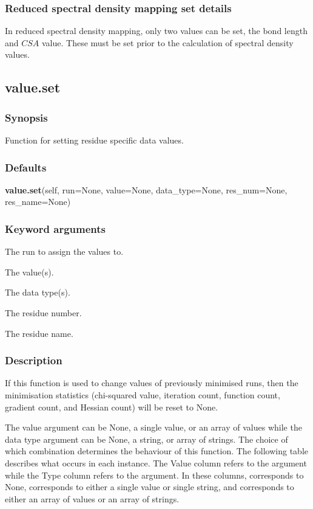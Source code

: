 \subsubsection{Reduced spectral density mapping set details}

In reduced spectral density mapping, only two values can be set, the bond length and $CSA$
value.  These must be set prior to the calculation of spectral density values.


\newpage

\subsection{value.set}


\subsubsection{Synopsis}

Function for setting residue specific data values.

\subsubsection{Defaults}

\textsf{\textbf{value.set}(self, run=None, value=None, data\_type=None, res\_num=None, res\_name=None)}


\subsubsection{Keyword arguments}


  The run to assign the values to.

  The value(s).

  The data type(s).

  The residue number.

  The residue name.

\subsubsection{Description}

If this function is used to change values of previously minimised runs, then the
minimisation statistics (chi-squared value, iteration count, function count, gradient count,
and Hessian count) will be reset to None.


The value argument can be None, a single value, or an array of values while the data type
argument can be None, a string, or array of strings.  The choice of which combination
determines the behaviour of this function.  The following table describes what occurs in
each instance.  The Value column refers to the 
 argument while the Type column refers
to the 
 argument.  In these columns, 
 corresponds to None, 
 corresponds
to either a single value or single string, and 
 corresponds to either an array of values
or an array of strings.



